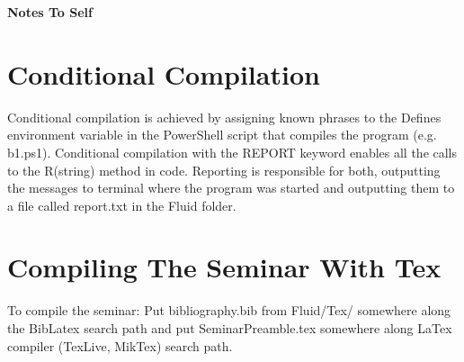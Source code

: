 

\cfoot{\thepage}								      %
\renewcommand{\headrulewidth}{0.0cm}			%
\renewcommand{\footrulewidth}{0.0cm}			%
\lstset{language=bash,basicstyle=\small\sffamily}



\begin{center}
   \textbf{\LARGE{Notes To Self}}\\[0.5cm]
\end{center}

\section{Conditional Compilation}

Conditional compilation is achieved by assigning known phrases to the Defines environment variable in the PowerShell script that compiles the program (e.g. b1.ps1). Conditional compilation with the REPORT keyword enables all the calls to the R(string) method in code. Reporting is responsible for both, outputting the messages to terminal where the program was started and outputting them to a file called report.txt in the Fluid folder.

\section{Compiling The Seminar With Tex}

To compile the seminar: Put bibliography.bib from Fluid/Tex/ somewhere along the BibLatex search path and put SeminarPreamble.tex somewhere along LaTex compiler (TexLive, MikTex) search path.

